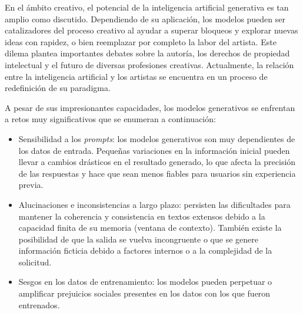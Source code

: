 En el ámbito creativo, el potencial de la inteligencia artificial generativa es tan amplio como discutido.
Dependiendo de su aplicación, los modelos pueden ser catalizadores del proceso creativo
al ayudar a superar bloqueos y explorar nuevas ideas con rapidez, o bien
reemplazar por completo la labor del artista. 
Este dilema plantea importantes debates sobre la autoría, los derechos de propiedad intelectual 
y el futuro de diversas profesiones creativas.
Actualmente, la relación entre la inteligencia artificial 
y los artistas se encuentra en un proceso de redefinición de su paradigma.

A pesar de sus impresionantes capacidades, 
los modelos generativos se enfrentan a retos muy significativos que se enumeran a continuación:
\begin{itemize}
\item Sensibilidad a los \textit{prompts}:
los modelos generativos son muy dependientes de los datos de entrada.
Pequeñas variaciones en la información inicial pueden llevar a cambios drásticos en el resultado generado,
lo que afecta la precisión de las respuestas y hace que sean menos fiables para usuarios sin experiencia previa.
\item Alucinaciones e inconsistencias a largo plazo:
persisten las dificultades para mantener la coherencia y consistencia
en textos extensos debido a la capacidad finita de su memoria (ventana de contexto).
También existe la posibilidad de que la salida se vuelva incongruente o que se genere información ficticia
debido a factores internos o a la complejidad de la solicitud.
\item Sesgos en los datos de entrenamiento: 
los modelos pueden perpetuar o amplificar prejuicios sociales presentes en los datos con los que fueron entrenados.
\end{itemize}

